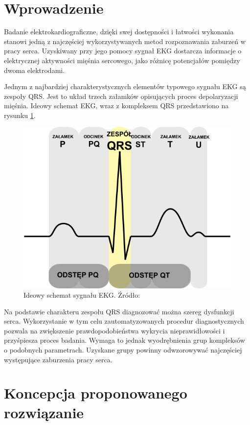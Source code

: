 \section{Wprowadzenie}
Badanie elektrokardiograficzne, dzięki swej dostępności i łatwości wykonania stanowi jedną z najczęściej wykorzystywanych metod rozpoznawania zaburzeń w pracy serca. Uzyskiwany przy jego pomocy sygnał EKG dostarcza informacje o elektrycznej aktywności mięśnia sercowego, jako różnicę potencjałów pomiędzy dwoma elektrodami.

Jednym z najbardziej charakterystycznych elementów typowego sygnału EKG są zespoły QRS. Jest to układ trzech załamków opisujących proces depolaryzacji mięśnia. Ideowy schemat EKG, wraz z kompleksem QRS przedstawiono na rysunku \ref{fig:qrs-complex}.


\begin{figure}[H]
	\centering
	\includegraphics[width=12cm]{img/qrs-complex}
	\caption{Ideowy schemat sygnału EKG. Źródło: \cite{qrs-wiki}}
	\label{fig:qrs-complex}
\end{figure}

Na podstawie charakteru zespołu QRS diagnozować można szereg dysfunkcji serca. Wykorzystanie w tym celu zautomatyzowanych procedur diagnostycznych pozwala na zwiększenie prawdopodobieństwa wykrycia nieprawidłowości i przyśpiesza proces badania. Wymaga to jednak wyodrębnienia grup kompleksów o podobnych parametrach. Uzyskane grupy powinny odwzorowywać najczęściej występujące zaburzenia pracy serca.

\section{Koncepcja proponowanego rozwiązanie}

